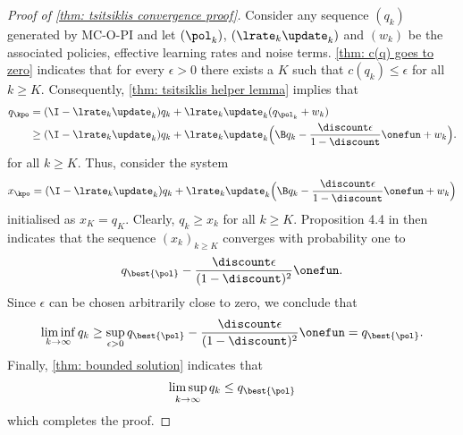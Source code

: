 
\begin{proof}[Proof of \autoref{thm: tsitsiklis convergence proof}]
Consider any sequence $(q_k)$ generated by MC-O-PI and let $(\pol_k)$, $(\lrate_k \update_k)$ and $(w_k)$ be the associated policies, effective learning rates and noise terms.
\autoref{thm: c(q) goes to zero} indicates that for every $\epsilon > 0$ there exists a $K$ such that $c(q_k) \leq \epsilon$ for all $k \geq K$. Consequently, \autoref{thm: tsitsiklis helper lemma} implies that
\begin{align*}
    q_\kpo
    &= (\I - \lrate_k \update_k) q_k + \lrate_k \update_k (q_{\pol_k} + w_k)
    \\
    & \geq (\I - \lrate_k \update_k) q_k + \lrate_k \update_k \Big( \B q_k - \frac{\discount \epsilon}{1 - \discount} \onefun + w_k \Big) .
\end{align*}
for all $k \geq K$.
Thus, consider the system
\begin{align*}
    x_\kpo = (\I - \lrate_k \update_k) q_k + \lrate_k \update_k \Big( \B q_k - \frac{\discount \epsilon}{1 - \discount} \onefun + w_k \Big)
\end{align*}
initialised as $x_K = q_K$. Clearly, $q_k \geq x_k$ for all $k \geq K$.
Proposition 4.4 in \citep{Bertsekas1996Neuro-DynamicProgramming} then indicates that the sequence $(x_k)_{k \geq K}$ converges with probability one to
\begin{align*}
    q_{\best{\pol}} - \frac{\discount \epsilon}{(1-\discount)^2} \onefun .
\end{align*}
Since $\epsilon$ can be chosen arbitrarily close to zero, we conclude that
\begin{align*}
    \liminf_{k \to \infty} q_k \geq \sup_{\epsilon > 0}
    q_{\best{\pol}} - \frac{\discount \epsilon}{(1-\discount)^2} \onefun
    =
    q_{\best{\pol}} .
\end{align*}
Finally, \autoref{thm: bounded solution} indicates that
\begin{align*}
    \limsup_{k \to \infty} q_k \leq q_{\best{\pol}}
\end{align*}
which completes the proof.
\end{proof}